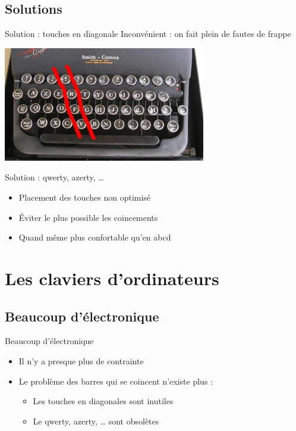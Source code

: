 \documentclass{beamer}
\begin{document}
\subsection{Solutions}
\begin{frame}{Solution : touches en diagonale}
Inconvénient : on fait plein de fautes de frappe
\begin{center}
\includegraphics[height=5cm]{touches-diagonales.jpg}
\end{center}
\end{frame}

\begin{frame}{Solution : qwerty, azerty, …}
\begin{itemize}
  \item Placement des touches non optimisé
  \item Éviter le plus possible les coincements
  \item Quand même plus confortable qu'en abcd
\end{itemize}
\end{frame}

\section{Les claviers d'ordinateurs}
\begin{frame}
  \tableofcontents[sectionstyle=show/shaded, hideothersubsections]
\end{frame}

\subsection{Beaucoup d'électronique}
\begin{frame}{Beaucoup d'électronique}
\begin{itemize}
  \item Il n'y a presque plus de contrainte
  \item Le problème des barres qui se coincent n'existe plus :
  \begin{itemize}
    \item Les touches en diagonales sont inutiles
    \item Le qwerty, azerty, … sont obsolètes
  \end{itemize}
\end{itemize}
\end{frame}
\end{document}

